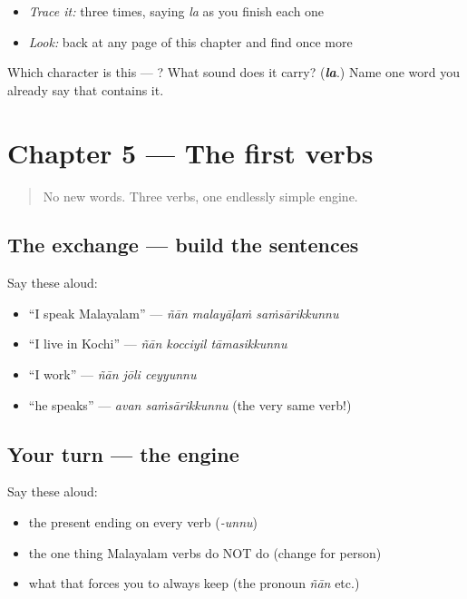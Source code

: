 \begin{itemize}
\raggedright
  \item \emph{Trace it:}  three times, saying \emph{la} as you finish each one
  \item \emph{Look:} back at any page of this chapter and find  once more
\end{itemize}

\begin{tcolorbox}[breakable,colback=teal!4,colframe=teal!35!black,title={Before you move on}]
Which character is this — ? What sound does it carry? (\emph{\textbf{la}}.) Name one word you already say that contains it.
\end{tcolorbox}
\section[Practice]{Chapter 5 — The first verbs}

\label{lesson:ML-C05-practice}



\begin{quote}
No new words. Three verbs, one endlessly simple engine.
\end{quote}

\subsection*{The exchange — build the sentences}
Say these aloud:

\begin{itemize}
\raggedright
  \item \textquotedblleft{}I speak Malayalam\textquotedblright{} — \emph{ñān malayāḷaṁ saṁsārikkunnu}
  \item \textquotedblleft{}I live in Kochi\textquotedblright{} — \emph{ñān kocciyil tāmasikkunnu}
  \item \textquotedblleft{}I work\textquotedblright{} — \emph{ñān jōli ceyyunnu}
  \item \textquotedblleft{}he speaks\textquotedblright{} — \emph{avan saṁsārikkunnu} (the very same verb!)
\end{itemize}

\subsection*{Your turn — the engine}
Say these aloud:

\begin{itemize}
\raggedright
  \item the present ending on every verb (\emph{-unnu})
  \item the one thing Malayalam verbs do NOT do (change for person)
  \item what that forces you to always keep (the pronoun \emph{ñān} etc.)
\end{itemize}

